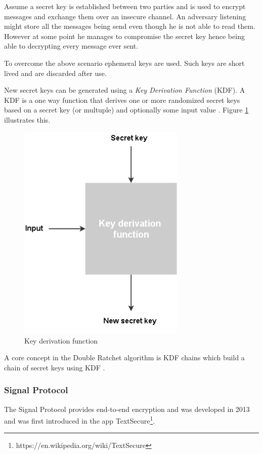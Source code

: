 Assume a secret key is established between two parties and is used to encrypt messages and exchange them over an insecure channel. An adversary listening might store all the messages being send even though he is not able to read them. However at some point he manages to compromise the secret key hence being able to decrypting every message ever sent.

To overcome the above scenario ephemeral keys are used. Such keys are short lived and are discarded after use.   

New secret keys can be generated using a \emph{Key Derivation Function} (KDF).
A KDF is a one way function that derives one or more randomized secret keys based on a secret key (or multuple) and optionally some input value \cite{crypto101}. Figure \ref{fig:kdf} illustrates this.

 \begin{figure}[H] 
 	\centering
 	\includegraphics[width=8cm]{figures/kdf.png}
 	\caption{Key derivation function}
 	\label{fig:kdf}
 \end{figure}


A core concept in the Double Ratchet algorithm is KDF chains which build a chain of secret keys using KDF \cite{doubleratchet}. 


\subsubsection{Signal Protocol}

The Signal Protocol provides end-to-end encryption and was developed in 2013 and was first introduced in the app TextSecure\footnote{https://en.wikipedia.org/wiki/TextSecure}.

